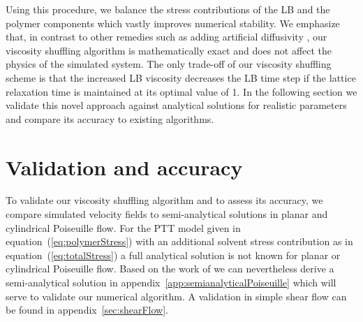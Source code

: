 \documentclass[a4paper,12pt]{scrartcl}
\begin{document}
Using this procedure, we balance the stress contributions of the LB and the polymer components which vastly improves numerical stability.
We emphasize that, in contrast to other remedies such as adding artificial diffusivity \cite{malaspinas2010,ma2020,wang2020,wang2021}, our viscosity shuffling algorithm is mathematically exact and does not affect the physics of the simulated system.
The only trade-off of our viscosity shuffling scheme is that the increased LB viscosity decreases the LB time step if the lattice relaxation time is maintained at its optimal value of 1.
In the following section we validate this novel approach against analytical solutions for realistic parameters and compare its accuracy to existing algorithms.


\section{Validation and accuracy}

To validate our viscosity shuffling algorithm and to assess its accuracy, we compare simulated velocity fields to semi-analytical solutions in planar and cylindrical Poiseuille flow.
For the PTT model given in equation~(\ref{eq:polymerStress}) with an additional solvent stress contribution as in equation~(\ref{eq:totalStress}) a full analytical solution is not known for planar or cylindrical Poiseuille flow.
Based on the work of \cite{oliveira1999} we can nevertheless derive a semi-analytical solution in appendix~\ref{app:semianalyticalPoiseuille} which will serve to validate our numerical algorithm.
A validation in simple shear flow can be found in appendix~\ref{sec:shearFlow}.
\end{document}
